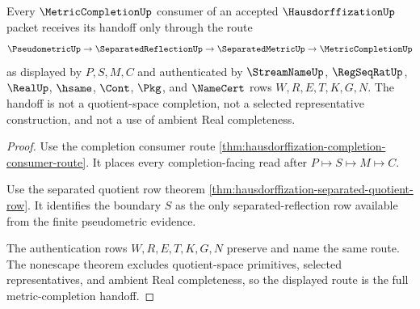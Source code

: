 \begin{theorem}
\label{thm:hausdorffization-metriccompletion-handoff}
Every $\MetricCompletionUp$ consumer of an accepted $\HausdorffizationUp$ packet receives its handoff only through the route
$$
\PseudometricUp \to \SeparatedReflectionUp \to \SeparatedMetricUp \to \MetricCompletionUp
$$
as displayed by $P,S,M,C$ and authenticated by $\StreamNameUp$, $\RegSeqRatUp$, $\RealUp$, $\hsame$, $\Cont$, $\Pkg$, and $\NameCert$ rows $W,R,E,T,K,G,N$. The handoff is not a quotient-space completion, not a selected representative construction, and not a use of ambient Real completeness.
\end{theorem}
\begin{proof}
Use the completion consumer route \autoref{thm:hausdorffization-completion-consumer-route}. It places every completion-facing read after $P \longmapsto S \longmapsto M \longmapsto C$.

Use the separated quotient row theorem \autoref{thm:hausdorffization-separated-quotient-row}. It identifies the boundary $S$ as the only separated-reflection row available from the finite pseudometric evidence.

The authentication rows $W,R,E,T,K,G,N$ preserve and name the same route. The nonescape theorem excludes quotient-space primitives, selected representatives, and ambient Real completeness, so the displayed route is the full metric-completion handoff.
\end{proof}

